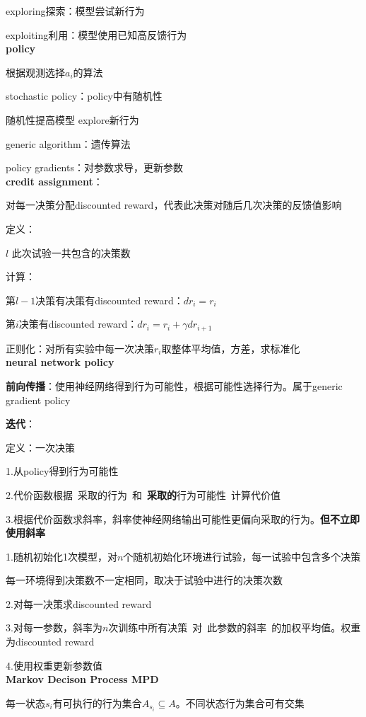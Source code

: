 \documentclass[UTF8]{ctexart}
\begin{document}
  exploring探索：模型尝试新行为
  
  exploiting利用：模型使用已知高反馈行为\\
\textbf{policy}

  根据观测选择$a_i$的算法

  stochastic policy：policy中有随机性

  \quad 随机性提高模型 explore新行为

  generic algorithm：遗传算法

  policy gradients：对参数求导，更新参数\\
\textbf{credit assignment}：

  对每一决策分配discounted reward，代表此决策对随后几次决策的反馈值影响

  定义：

  \quad $l$ 此次试验一共包含的决策数

  计算：

  \quad 第$l-1$决策有决策有discounted reward：$dr_i = r_i$
  
  \quad 第$i$决策有discounted reward：$dr_i = r_i + \gamma dr_{i+1}$
  
  \quad 正则化：对所有实验中每一次决策$r_i$取整体平均值，方差，求标准化\\
\textbf{neural network policy}

  \textbf{前向传播}：使用神经网络得到行为可能性，根据可能性选择行为。属于generic gradient policy

  \textbf{迭代}：

  \quad 定义：一次决策

  \quad \quad 1.从policy得到行为可能性

  \quad \quad 2.代价函数根据\ 采取的行为\ 和\ \textbf{采取的}行为可能性\ 计算代价值

  \quad \quad 3.根据代价函数求斜率，斜率使神经网络输出可能性更偏向采取的行为。\textbf{但不立即使用斜率}

  \quad 1.随机初始化1次模型，对$n$个随机初始化环境进行试验，每一试验中包含多个决策
  
  \quad \quad 每一环境得到决策数不一定相同，取决于试验中进行的决策次数

  \quad 2.对每一决策求discounted reward
  
  \quad 3.对每一参数，斜率为$n$次训练中所有决策\ 对\ 此参数的斜率\ 的加权平均值。权重为discounted reward

  \quad 4.使用权重更新参数值\\
\textbf{Markov Decison Process MPD}

  每一状态$s_i$有可执行的行为集合$A_{s_i} \subseteq A$。不同状态行为集合可有交集
\end{document}
